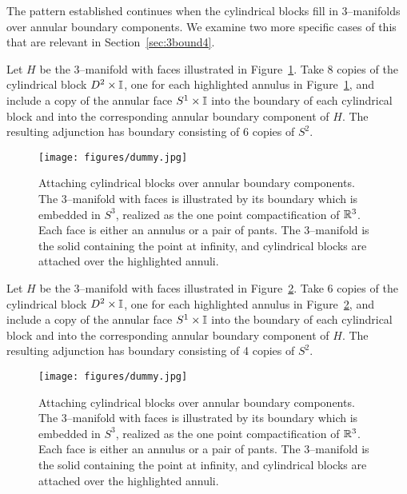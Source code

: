 The pattern established continues when the cylindrical blocks fill in 3--manifolds over annular boundary components.
We examine two more specific cases of this that are relevant in Section~\ref{sec:3bound4}.

\begin{ex}
	\label{ex:interactivefiber1uDxI}
	Let $H$ be the 3--manifold with faces illustrated in Figure~\ref{fig:interactivefiber1uDxI}.
	Take 8 copies of the cylindrical block $D^2\times\mathbb{I}$, one for each highlighted annulus in Figure~\ref{fig:interactivefiber1uDxI}, and include a copy of the annular face $S^1\times\mathbb{I}$ into the boundary of each cylindrical block and into the corresponding annular boundary component of $H$.
	The resulting adjunction has boundary consisting of 6 copies of $S^2$.
\end{ex}

\begin{figure}[H]
	\centering
	\caption{Attaching cylindrical blocks over annular boundary components.
	The 3--manifold with faces is illustrated by its boundary which is embedded in $S^3$, realized as the one point compactification of $ \mathbb{R}^3 $.
	Each face is either an annulus or a pair of pants.
	The 3--manifold is the solid containing the point at infinity, and cylindrical blocks are attached over the highlighted annuli.}
	\texttt{[image: figures/dummy.jpg]}
	\label{fig:interactivefiber1uDxI}
\end{figure}

\begin{ex}
	\label{ex:interactivefiber2uDxI}
	Let $H$ be the 3--manifold with faces illustrated in Figure~\ref{fig:interactivefiber2uDxI}.
	Take 6 copies of the cylindrical block $D^2\times\mathbb{I}$, one for each highlighted annulus in Figure~\ref{fig:interactivefiber2uDxI}, and include a copy of the annular face $S^1\times\mathbb{I}$ into the boundary of each cylindrical block and into the corresponding annular boundary component of $H$.
	The resulting adjunction has boundary consisting of 4 copies of $S^2$.
\end{ex}

\begin{figure}[H]
	\centering
	\caption{Attaching cylindrical blocks over annular boundary components.
		The 3--manifold with faces is illustrated by its boundary which is embedded in $S^3$, realized as the one point compactification of $ \mathbb{R}^3 $.
		Each face is either an annulus or a pair of pants.
		The 3--manifold is the solid containing the point at infinity, and cylindrical blocks are attached over the highlighted annuli.}
	\texttt{[image: figures/dummy.jpg]}
	\label{fig:interactivefiber2uDxI}
\end{figure}

